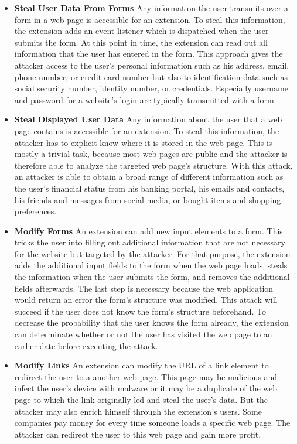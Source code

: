 	\begin{itemize}
		\item \textbf{Steal User Data From Forms} Any information the user transmits over a form in a web page is accessible for an extension. To steal this information, the extension adds an event listener which is dispatched when the user submits the form. At this point in time, the extension can read out all information that the user has entered in the form. This approach gives the attacker access to the user's personal information such as his address, email, phone number, or credit card number but also to identification data such as social security number, identity number, or credentials. Especially username and password for a website's login are typically transmitted with a form.
		
		\item \textbf{Steal Displayed User Data} Any information about the user that a web page contains is accessible for an extension. To steal this information, the attacker has to explicit know where it is stored in the web page. This is mostly a trivial task, because most web pages are public and the attacker is therefore able to analyze the targeted web page's structure. With this attack, an attacker is able to obtain a broad range of different information such as the user's financial status from his banking portal, his emails and contacts, his friends and messages from social media, or bought items and shopping preferences.
		
		\item \textbf{Modify Forms} An extension can add new input elements to a form. This tricks the user into filling out additional information that are not necessary for the website but targeted by the attacker. For that purpose, the extension adds the additional input fields to the form when the web page loads, steals the information when the user submits the form, and removes the additional fields afterwards. The last step is necessary because the web application would return an error the form's structure was modified. This attack will succeed if the user does not know the form's structure beforehand. To decrease the probability that the user knows the form already, the extension can determinate whether or not the user has visited the web page to an earlier date before executing the attack. 
		
		\item \textbf{Modify Links} An extension can modify the URL of a link element to redirect the user to a another web page. This page may be malicious and infect the user's device with malware or it may be a duplicate of the web page to which the link originally led and steal the user's data. But the attacker may also enrich himself through the extension's users. Some companies pay money for every time someone loads a specific web page. The attacker can redirect the user to this web page and gain more profit.


\end{itemize}
